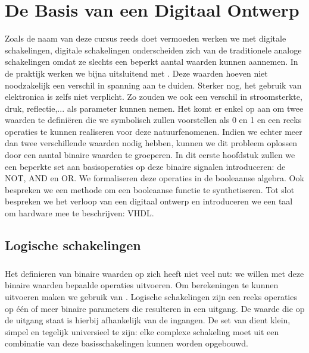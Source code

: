 \chapter{De Basis van een Digitaal Ontwerp}
\label{ch:basis}
\begin{chapterintro}
Zoals de naam van deze cursus reeds doet vermoeden werken we met digitale schakelingen, digitale schakelingen onderscheiden zich van de traditionele analoge schakelingen omdat ze slechts een beperkt aantal waarden kunnen aannemen. In de praktijk werken we bijna uitsluitend met . Deze waarden hoeven niet noodzakelijk een verschil in spanning aan te duiden. Sterker nog, het gebruik van elektronica is zelfs niet verplicht. Zo zouden we ook een verschil in stroomsterkte, druk, reflectie,... als parameter kunnen nemen. Het komt er enkel op aan om twee waarden te defini\"eren die we symbolisch zullen voorstellen als 0 en 1 en een reeks operaties te kunnen realiseren voor deze natuurfenomenen. Indien we echter meer dan twee verschillende waarden nodig hebben, kunnen we dit probleem oplossen door een aantal binaire waarden te groeperen. In dit eerste hoofdstuk zullen we een beperkte set aan basisoperaties op deze binaire signalen introduceren: de NOT, AND en OR. We formaliseren deze operaties in de booleaanse algebra. Ook bespreken we een methode om een booleaanse functie te synthetiseren. Tot slot bespreken we het verloop van een digitaal ontwerp en introduceren we een taal om hardware mee te beschrijven: VHDL.
\end{chapterintro}
\minitoc[n]
\section{Logische schakelingen}
\paragraph{}
Het definieren van binaire waarden op zich heeft niet veel nut: we willen met deze binaire waarden bepaalde operaties uitvoeren. Om berekeningen te kunnen uitvoeren maken we gebruik van . Logische schakelingen zijn een reeks operaties op \'e\'en of meer binaire parameters die resulteren in een uitgang. De waarde die op de uitgang staat is hierbij afhankelijk van de ingangen. De set van  dient klein, simpel en tegelijk universieel te zijn: elke complexe schakeling moet uit een combinatie van deze basisschakelingen kunnen worden opgebouwd.
